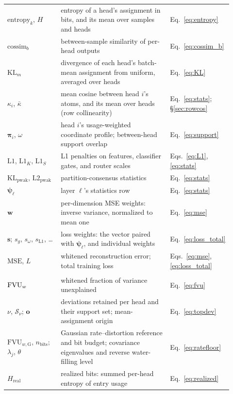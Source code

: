 \begin{longtable}{@{}>{\raggedright\arraybackslash}p{0.25\linewidth}%
>{\raggedright\arraybackslash}p{0.52\linewidth}%
>{\raggedright\arraybackslash}p{0.15\linewidth}@{}}
$\mathrm{entropy}_k$, $H$ & entropy of a head's assignment in bits, and its mean over samples and heads & Eq.~\eqref{eq:entropy} \\
$\mathrm{cossim}_b$ & between-sample similarity of per-head outputs & Eq.~\eqref{eq:cossim_b} \\
$\mathrm{KL}_m$ & divergence of each head's batch-mean assignment from uniform, averaged over heads & Eq.~\eqref{eq:KL} \\
$\kappa_i$, $\bar\kappa$ & mean cosine between head $i$'s atoms, and its mean over heads (row collinearity) & Eq.~\eqref{eq:stats}; §\ref{sec:rowcos} \\
$\boldsymbol{\pi}_i$, $\omega$ & head $i$'s usage-weighted coordinate profile; between-head support overlap & Eq.~\eqref{eq:support} \\
$\mathrm{L1}$, $\mathrm{L1}_K$, $\mathrm{L1}_S$ & L1 penalties on features, classifier gates, and router scales & Eqs.~\eqref{eq:L1}, \eqref{eq:stats} \\
$\mathrm{KL}_{\mathrm{pwak}}$, $\mathrm{L2}_{\mathrm{pwak}}$ & partition-consensus statistics & Eq.~\eqref{eq:stats} \\
$\boldsymbol{\psi}_\ell$ & layer $\ell$'s statistics row & Eq.~\eqref{eq:stats} \\
$\mathbf{w}$ & per-dimension MSE weights: inverse variance, normalized to mean one & Eq.~\eqref{eq:mse} \\
$\mathbf{s}$; $s_g$, $s_\omega$, $s_{\mathrm{L1}}$, \dots & loss weights: the vector paired with $\boldsymbol{\psi}_\ell$, and individual weights & Eq.~\eqref{eq:loss_total} \\
$\mathrm{MSE}$, $L$ & whitened reconstruction error; total training loss & Eqs.~\eqref{eq:mse}, \eqref{eq:loss_total} \\
\addlinespace
\multicolumn{3}{@{}l}{\emph{Evaluation and baselines}} \\[2pt]
$\mathrm{FVU}_w$ & whitened fraction of variance unexplained & Eq.~\eqref{eq:fvu} \\
$\nu$, $\mathcal{S}_\nu$; $\mathbf{o}$ & deviations retained per head and their support set; mean-assignment origin & Eq.~\eqref{eq:topdev} \\
$\mathrm{FVU}_{w,\mathrm{G}}$, $n_{\mathrm{bits}}$; $\lambda_j$, $\theta$ & Gaussian rate--distortion reference and bit budget; covariance eigenvalues and reverse water-filling level & Eq.~\eqref{eq:ratefloor} \\
$H_{\mathrm{real}}$ & realized bits: summed per-head entropy of entry usage & Eq.~\eqref{eq:realized} \\

\end{longtable}
